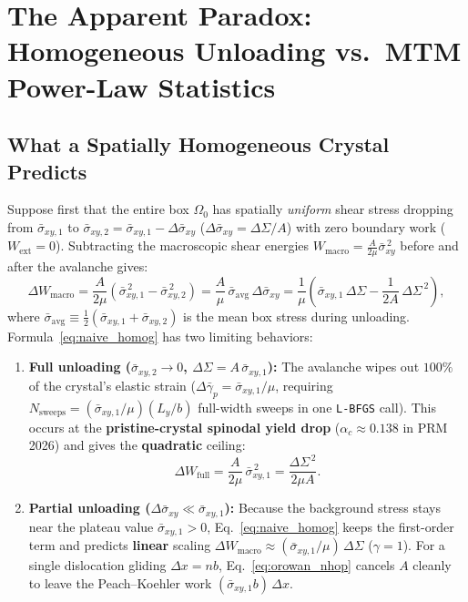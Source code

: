 \documentclass[11pt,a4paper]{article}
\newcommand{\code}[1]{\texttt{#1}}
\newcommand{\dS}{\Delta\Sigma}
\newcommand{\dsigbar}{\Delta\bar{\sigma}_{xy}}
\newcommand{\sigbar}{\bar{\sigma}_{xy}}
\begin{document}
\section{The Apparent Paradox: Homogeneous Unloading vs.\ MTM Power-Law Statistics}
\label{sec:paradox}

\subsection{What a Spatially Homogeneous Crystal Predicts}

Suppose first that the entire box $\Omega_0$ has spatially \emph{uniform} shear stress dropping from $\bar{\sigma}_{xy,1}$ to $\bar{\sigma}_{xy,2} = \bar{\sigma}_{xy,1} - \dsigbar$ ($\dsigbar = \dS/A$) with zero boundary work ($W_{\mathrm{ext}}=0$). Subtracting the macroscopic shear energies $W_{\mathrm{macro}} = \frac{A}{2\mu}\sigbar^{\,2}$ before and after the avalanche gives:
\begin{equation}
\label{eq:naive_homog}
\Delta W_{\mathrm{macro}} = \frac{A}{2\mu}\left(\bar{\sigma}_{xy,1}^{\,2} - \bar{\sigma}_{xy,2}^{\,2}\right)
= \frac{A}{\mu}\,\bar{\sigma}_{\mathrm{avg}}\,\dsigbar
= \frac{1}{\mu}\left(\bar{\sigma}_{xy,1}\,\dS - \frac{1}{2A}\,\dS^{\,2}\right),
\end{equation}
where $\bar{\sigma}_{\mathrm{avg}} \equiv \frac{1}{2}(\bar{\sigma}_{xy,1}+\bar{\sigma}_{xy,2})$ is the mean box stress during unloading.
Formula~\eqref{eq:naive_homog} has two limiting behaviors:
\begin{enumerate}[nosep]
  \item \textbf{Full unloading ($\bar{\sigma}_{xy,2} \to 0$, $\dS = A\,\bar{\sigma}_{xy,1}$):} The avalanche wipes out $100\%$ of the crystal's elastic strain ($\Delta\bar{\gamma}_p = \bar{\sigma}_{xy,1}/\mu$, requiring $N_{\mathrm{sweeps}} = (\bar{\sigma}_{xy,1}/\mu)(L_y/b)$ full-width sweeps in one \code{L-BFGS} call). This occurs at the \textbf{pristine-crystal spinodal yield drop} ($\alpha_c \approx 0.138$ in PRM 2026) and gives the \textbf{quadratic} ceiling:
  \begin{equation}
  \Delta W_{\mathrm{full}} = \frac{A}{2\mu}\,\bar{\sigma}_{xy,1}^{\,2} = \frac{\dS^{\,2}}{2\mu A}.
  \end{equation}
  \item \textbf{Partial unloading ($\dsigbar \ll \bar{\sigma}_{xy,1}$):} Because the background stress stays near the plateau value $\bar{\sigma}_{xy,1} > 0$, Eq.~\eqref{eq:naive_homog} keeps the first-order term and predicts \textbf{linear} scaling $\Delta W_{\mathrm{macro}} \approx (\bar{\sigma}_{xy,1}/\mu)\,\dS$ ($\gamma=1$). For a single dislocation gliding $\Delta x = n b$, Eq.~\eqref{eq:orowan_nhop} cancels $A$ cleanly to leave the Peach--Koehler work $(\bar{\sigma}_{xy,1} b)\,\Delta x$.
\end{enumerate}
\end{document}
